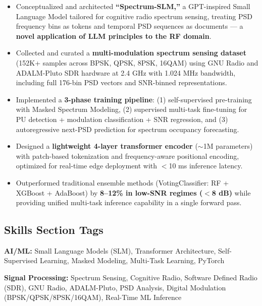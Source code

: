 \documentclass[12pt, a4paper]{article}
\begin{document}
\begin{keybox}
\begin{itemize}[leftmargin=1.5em, itemsep=6pt]
    \item Conceptualized and architected \textbf{``Spectrum-SLM,''} a GPT-inspired Small Language Model tailored for cognitive radio spectrum sensing, treating PSD frequency bins as tokens and temporal PSD sequences as documents — a \textbf{novel application of LLM principles to the RF domain}.

    \item Collected and curated a \textbf{multi-modulation spectrum sensing dataset} (152K+ samples across BPSK, QPSK, 8PSK, 16QAM) using GNU Radio and ADALM-Pluto SDR hardware at 2.4 GHz with 1.024 MHz bandwidth, including full 176-bin PSD vectors and SNR-binned representations.

    \item Implemented a \textbf{3-phase training pipeline}: (1) self-supervised pre-training with Masked Spectrum Modeling, (2) supervised multi-task fine-tuning for PU detection + modulation classification + SNR regression, and (3) autoregressive next-PSD prediction for spectrum occupancy forecasting.

    \item Designed a \textbf{lightweight 4-layer transformer encoder} ($\sim$1M parameters) with patch-based tokenization and frequency-aware positional encoding, optimized for real-time edge deployment with $<$10 ms inference latency.

    \item Outperformed traditional ensemble methods (VotingClassifier: RF + XGBoost + AdaBoost) by \textbf{8--12\% in low-SNR regimes ($<$8 dB)} while providing unified multi-task inference capability in a single forward pass.
\end{itemize}
\end{keybox}


\subsection{Skills Section Tags}

\begin{notebox}
\textbf{AI/ML:} Small Language Models (SLM), Transformer Architecture, Self-Supervised Learning, Masked Modeling, Multi-Task Learning, PyTorch

\textbf{Signal Processing:} Spectrum Sensing, Cognitive Radio, Software Defined Radio (SDR), GNU Radio, ADALM-Pluto, PSD Analysis, Digital Modulation (BPSK/QPSK/8PSK/16QAM), Real-Time ML Inference
\end{notebox}
\end{document}
